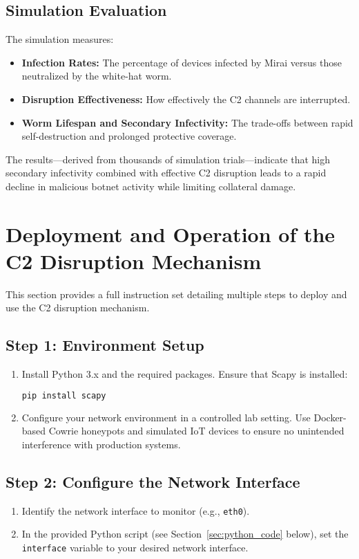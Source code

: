 \documentclass{article}
\begin{document}
\subsection{Simulation Evaluation}
The simulation measures:
\begin{itemize}
    \item \textbf{Infection Rates:} The percentage of devices infected by Mirai versus those neutralized by the white-hat worm.
    \item \textbf{Disruption Effectiveness:} How effectively the C2 channels are interrupted.
    \item \textbf{Worm Lifespan and Secondary Infectivity:} The trade-offs between rapid self-destruction and prolonged protective coverage.
\end{itemize}
The results—derived from thousands of simulation trials—indicate that high secondary infectivity combined with effective C2 disruption leads to a rapid decline in malicious botnet activity while limiting collateral damage.

\section{Deployment and Operation of the C2 Disruption Mechanism}
\noindent
This section provides a full instruction set detailing multiple steps to deploy and use the C2 disruption mechanism.

\subsection{Step 1: Environment Setup}
\begin{enumerate}
    \item Install Python 3.x and the required packages. Ensure that Scapy is installed:
    \begin{lstlisting}[language=bash]
pip install scapy
    \end{lstlisting}
    \item Configure your network environment in a controlled lab setting. Use Docker-based Cowrie honeypots and simulated IoT devices to ensure no unintended interference with production systems.
\end{enumerate}

\subsection{Step 2: Configure the Network Interface}
\begin{enumerate}
    \item Identify the network interface to monitor (e.g., \texttt{eth0}).
    \item In the provided Python script (see Section~\ref{sec:python_code} below), set the \texttt{interface} variable to your desired network interface.
\end{enumerate}
\end{document}
